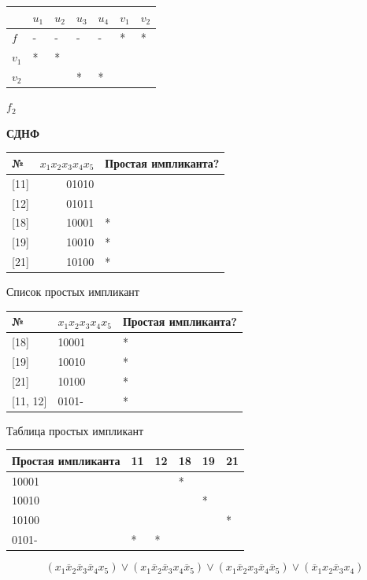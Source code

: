 \begin{longtable}[]{@{}lllllll@{}}
\toprule
& \(u_1\) & \(u_2\) & \(u_3\) & \(u_4\) & \(v_1\) &
\(v_2\)\tabularnewline
\midrule
\endhead
\(f\) & - & - & - & - & * & *\tabularnewline
\(v_1\) & * & * & & & &\tabularnewline
\(v_2\) & & & * & * & &\tabularnewline
\bottomrule
\end{longtable}

\(f_2\)

\textbf{СДНФ}

\begin{longtable}[]{@{}lrl@{}}
\toprule
№ & \(x_1x_2x_3x_4x_5\) & Простая импликанта?\tabularnewline
\midrule
\endhead
{[}11{]} & 01010 &\tabularnewline
{[}12{]} & 01011 &\tabularnewline
{[}18{]} & 10001 & *\tabularnewline
{[}19{]} & 10010 & *\tabularnewline
{[}21{]} & 10100 & *\tabularnewline
\bottomrule
\end{longtable}

Список простых импликант

\begin{longtable}[]{@{}lll@{}}
\toprule
№ & \(x_1x_2x_3x_4x_5\) & Простая импликанта?\tabularnewline
\midrule
\endhead
{[}18{]} & 10001 & *\tabularnewline
{[}19{]} & 10010 & *\tabularnewline
{[}21{]} & 10100 & *\tabularnewline
{[}11, 12{]} & 0101- & *\tabularnewline
\bottomrule
\end{longtable}

Таблица простых импликант

\begin{longtable}[]{@{}llllll@{}}
\toprule
Простая импликанта & 11 & 12 & 18 & 19 & 21\tabularnewline
\midrule
\endhead
10001 & & & * & &\tabularnewline
10010 & & & & * &\tabularnewline
10100 & & & & & *\tabularnewline
0101- & * & * & & &\tabularnewline
\bottomrule
\end{longtable}

\[( x_1\overline x_2\overline x_3\overline x_4x_5 ) \lor ( x_1\overline x_2\overline x_3x_4\overline x_5 ) \lor ( x_1\overline x_2x_3\overline x_4\overline x_5 ) \lor ( \overline x_1x_2\overline x_3x_4 )\]

